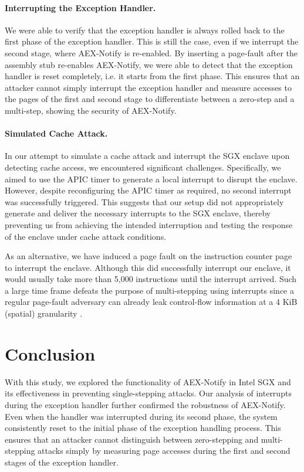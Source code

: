 \documentclass{llncs}
\begin{document}
\paragraph{Interrupting the Exception Handler.}
We were able to verify that the exception handler is always rolled back to the
first phase of the exception handler.
This is still the case, even if we interrupt the second stage, where AEX-Notify
is re-enabled.
By inserting a page-fault after the assembly stub re-enables AEX-Notify, we
were able to detect that the exception handler is reset completely, i.e. it
starts from the first phase.
This ensures that an attacker cannot simply interrupt the exception handler and
measure accesses to the pages of the first and second stage to differentiate
between a zero-step and a multi-step, showing the security of AEX-Notify.

\paragraph{Simulated Cache Attack.}
In our attempt to simulate a cache attack and interrupt the SGX enclave upon
detecting cache access, we encountered significant challenges.
Specifically, we aimed to use the APIC timer to generate a local interrupt to
disrupt the enclave.
However, despite reconfiguring the APIC timer as required, no second interrupt
was successfully triggered.
This suggests that our setup did not appropriately generate and deliver the
necessary interrupts to the SGX enclave, thereby preventing us from achieving
the intended interruption and testing the response of the enclave under cache
attack conditions.

As an alternative, we have induced a page fault on the instruction counter page
to interrupt the enclave.
Although this did successfully interrupt our enclave, it would usually take
more than 5,000 instructions until the interrupt arrived.
Such a large time frame defeats the purpose of multi-stepping using interrupts
since a regular page-fault adversary can already leak control-flow information
at a 4 KiB (spatial) granularity \cite{XuCP15}.

\section{Conclusion}

With this study, we explored the functionality of AEX-Notify in Intel SGX and
its effectiveness in preventing single-stepping attacks.
Our analysis of interrupts during the exception handler further confirmed the
robustness of AEX-Notify.
Even when the handler was interrupted during its second phase, the system
consistently reset to the initial phase of the exception handling process.
This ensures that an attacker cannot distinguish between zero-stepping and
multi-stepping attacks simply by measuring page accesses during the first and
second stages of the exception handler.
\end{document}
